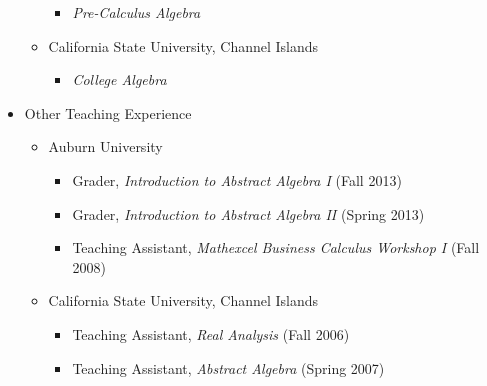 \documentclass[11pt]{article}
\begin{document}
\begin{itemize}
\begin{itemize}
\begin{itemize}
        \item{} \emph{Pre-Calculus Algebra}
      \end{itemize}
      \item{} California State University, Channel Islands
      \begin{itemize}
        \item{} \emph{College Algebra}
      \end{itemize}
    \end{itemize}

\newpage

    \item{} Other Teaching Experience
    \begin{itemize}
      \item{} Auburn University
      \begin{itemize}
        \item{}
          Grader,
          \emph{Introduction to Abstract Algebra I}
          (Fall 2013)
        \item{}
          Grader,
          \emph{Introduction to Abstract Algebra II}
          (Spring 2013)
        \item{}
          Teaching Assistant,
          \emph{Mathexcel Business Calculus Workshop I}
          (Fall 2008)
      \end{itemize}
      \item{} California State University, Channel Islands
      \begin{itemize}
        \item{}
          Teaching Assistant,
          \emph{Real Analysis}
          (Fall 2006)
        \item{}
          Teaching Assistant,
          \emph{Abstract Algebra}
          (Spring 2007)
      \end{itemize}
    \end{itemize}
  \end{itemize}
\end{document}
